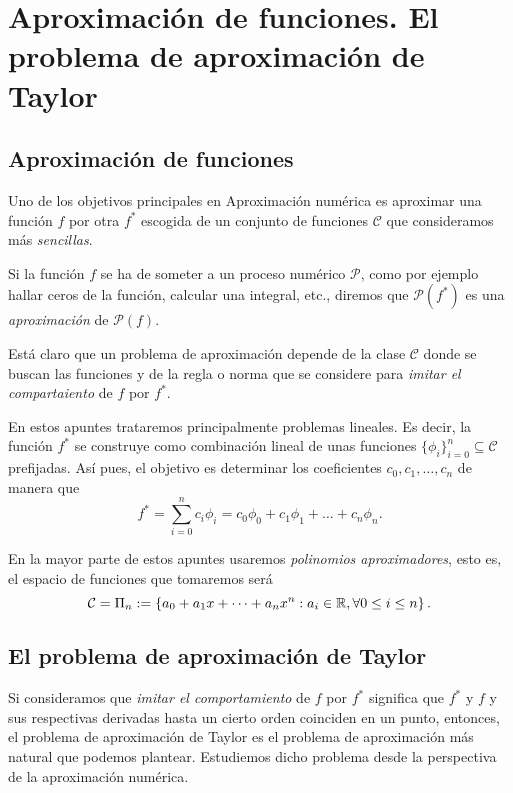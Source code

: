 \chapter[Aproximación de funciones]
  {Aproximación de funciones. El problema de aproximación de Taylor}

\section{Aproximación de funciones}
  Uno de los objetivos principales en Aproximación numérica es aproximar
  una función $f$ por otra $f^*$ escogida de un conjunto de funciones
  $\mathcal{C}$ que consideramos más \textit{sencillas}.

  Si la función $f$ se ha de someter a un proceso numérico $\mathcal{P}$,
  como por ejemplo hallar ceros de la función, calcular una integral, etc.,
  diremos que $\mathcal{P}(f^*)$ es una \textit{aproximación} de
  $\mathcal{P}(f)$.

  Está claro que un problema de aproximación depende de la clase
  $\mathcal{C}$ donde se buscan las funciones y de la regla o norma que se
  considere para \textit{imitar el compartaiento} de $f$ por $f^*$.

  En estos apuntes trataremos principalmente problemas lineales. Es decir,
  la función $f^*$ se construye como combinación lineal de unas funciones
  $\{\phi_i\}_{i=0}^n \subseteq \mathcal{C}$ prefijadas. Así pues, el
  objetivo es determinar los coeficientes $c_0, c_1, \dots, c_n$ de manera
  que
  \[
    f^* = \sum_{i=0}^n c_i \phi_i
    = c_0 \phi_0 + c_1 \phi_1 + \dots + c_n \phi_n.
  \]

  En la mayor parte de estos apuntes usaremos \textit{polinomios
  aproximadores}, esto es, el espacio de funciones que tomaremos será
  \[
    \mathcal{C} = \Pi_n := 
    \left\lbrace a_0 + a_1 x + \dots + a_n x^n :
    a_i \in \mathbb{R}, \forall 0 \le i \le n\right\rbrace.
  \]

\section[El problema de Taylor]{El problema de aproximación de Taylor}
  Si consideramos que \textit{imitar el comportamiento} de $f$ por $f^*$
  significa que $f^*$ y $f$ y sus respectivas derivadas hasta un cierto
  orden coinciden en un punto, entonces, el problema de aproximación de
  Taylor es el problema de aproximación más natural que podemos plantear.
  Estudiemos dicho problema desde la perspectiva de la aproximación
  numérica.

